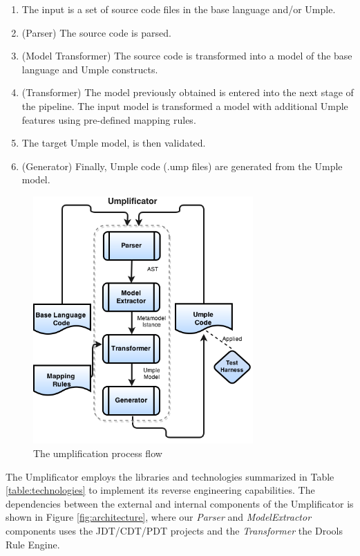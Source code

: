 \begin{enumerate}
\item  The input is a set of source code files in the base language and/or Umple.

\item (Parser) The source code is parsed. 

\item (Model Transformer) The source code is transformed into a model of the base language and Umple constructs.

\item (Transformer) The model previously obtained is entered into the next stage of the pipeline. The input model is transformed a model with additional Umple features using pre-defined mapping rules. 

\item The target Umple model, is then validated. 

\item (Generator) Finally, Umple code (.ump files) are generated from the Umple model.
\end{enumerate}

\begin{figure}[!t]
\centering
\includegraphics[width=0.75\textwidth]{Figures/Umplificator_ProcessFlow.png} 
\caption{The umplification process flow}
\label{fig:process_flow}
\end{figure}

The Umplificator employs the libraries and technologies summarized in Table \ref{table:technologies} to implement its reverse engineering capabilities. The dependencies between the external and internal components of the Umplificator is shown in Figure \ref{fig:architecture}, where our \textit{Parser} and \textit{ModelExtractor} components uses the JDT/CDT/PDT projects and the \textit{Transformer} the Drools Rule Engine. 

